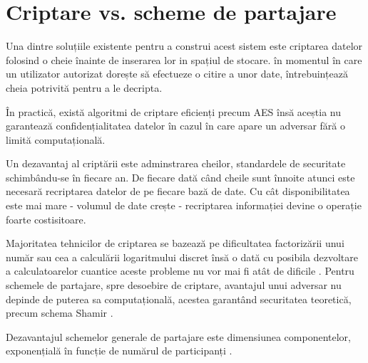 \documentclass[oneside, 12pt]{book}
\begin{document}

\section{Criptare vs. scheme de partajare}

Una dintre soluțiile existente pentru a construi acest sistem este criptarea datelor folosind o cheie înainte de inserarea lor in spațiul de stocare. în momentul în care un utilizator autorizat dorește să efectueze o citire a unor date, întrebuințează cheia potrivită pentru a le decripta.

În practică, există algoritmi de criptare eficienți precum AES însă aceștia nu garantează confidențialitatea datelor în cazul în care apare un adversar fără o limită computațională.

Un dezavantaj al criptării este adminstrarea cheilor, standardele de securitate schimbându-se în fiecare an.
De fiecare dată când cheile sunt înnoite atunci este necesară recriptarea datelor de pe fiecare bază de date. Cu cât disponibilitatea este mai mare - volumul de date crește - recriptarea informației devine o operație foarte costisitoare. 

Majoritatea tehnicilor de criptarea se bazează pe dificultatea factorizării unui număr sau cea a calculării logaritmului discret însă o dată cu posibila dezvoltare a calculatoarelor cuantice aceste probleme nu vor mai fi atât de dificile \cite{Shor:1994}.
Pentru schemele de partajare, spre desoebire de criptare, avantajul unui adversar nu depinde de puterea sa computațională, acestea garantând securitatea teoretică, precum schema Shamir \cite{S:1979}.

Dezavantajul schemelor generale de partajare este dimensiunea componentelor, exponențială în funcție de numărul de participanți \cite{Survey:2011}.

\end{document}
